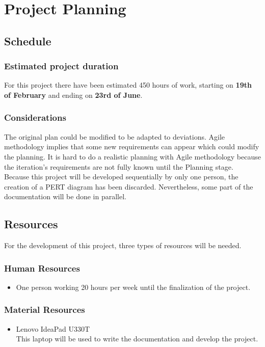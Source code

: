 \chapter{Project Planning}
\label{Chapter4}

\section{Schedule}
\subsection{Estimated project duration}
For this project there have been estimated 450 hours of work, starting on \textbf{19th of February} and ending on \textbf{23rd of June}.\\

\subsection{Considerations}
The original plan could be modified to be adapted to deviations. Agile methodology implies that some new requirements can appear which could modify the planning. It is hard to do a realistic planning with Agile methodology because the iteration's requirements are not fully known until the Planning stage.\\

Because this project will be developed sequentially by only one person, the creation of a PERT diagram has been discarded. Nevertheless, some part of the documentation will be done in parallel.

\section{Resources}
For the development of this project, three types of resources will be needed.
\subsection{Human Resources}
\begin{itemize}
	\item One person working 20 hours per week until the finalization of the project.
\end{itemize}
\subsection{Material Resources}
\begin{itemize}
	\item Lenovo IdeaPad U330T\\
	This laptop will be used to write the documentation and develop the project.
\end{itemize}
